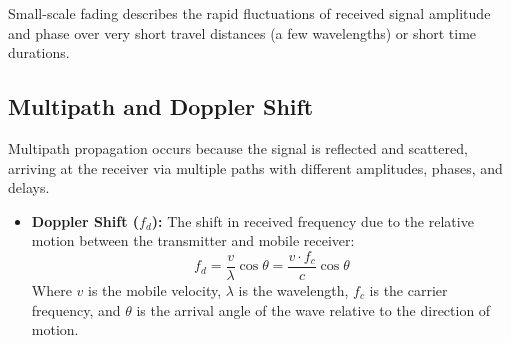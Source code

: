 \documentclass[12pt,a4paper]{article}
\begin{document}
Small-scale fading describes the rapid fluctuations of received signal amplitude and phase over very short travel distances (a few wavelengths) or short time durations.

\subsection{Multipath and Doppler Shift}
Multipath propagation occurs because the signal is reflected and scattered, arriving at the receiver via multiple paths with different amplitudes, phases, and delays.
\begin{itemize}[leftmargin=*, itemsep=3pt]
  \item \textbf{Doppler Shift ($f_d$):} The shift in received frequency due to the relative motion between the transmitter and mobile receiver:
    \begin{equation}
      f_d = \frac{v}{\lambda} \cos \theta = \frac{v \cdot f_c}{c} \cos \theta
    \end{equation}
    Where $v$ is the mobile velocity, $\lambda$ is the wavelength, $f_c$ is the carrier frequency, and $\theta$ is the arrival angle of the wave relative to the direction of motion.
\end{itemize}
\end{document}
